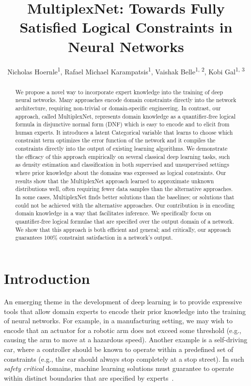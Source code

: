\documentclass[letterpaper]{article} %
\title{MultiplexNet: Towards Fully Satisfied Logical Constraints in Neural Networks}
\author {
    Nicholas Hoernle\textsuperscript{\rm 1},
    Rafael Michael Karampatsis\textsuperscript{\rm 1},
    Vaishak Belle\textsuperscript{\rm 1, \rm 2},
    Kobi Gal\textsuperscript{\rm 1, \rm 3}
}
\begin{document}
\maketitle

\begin{abstract}
We propose a novel way to incorporate expert knowledge into the training of deep neural networks.
Many approaches encode domain constraints directly into the network architecture, requiring non-trivial or domain-specific engineering. 
In contrast, our approach, called MultiplexNet, represents domain knowledge as a quantifier-free logical formula in disjunctive normal form (DNF) which is easy to encode and to elicit from human experts. 
It introduces a latent Categorical variable that learns to choose which constraint term optimizes the error function of the network and it compiles the constraints directly into the output of existing learning algorithms.
We demonstrate the efficacy of this approach empirically on several classical deep learning tasks, such as density estimation and classification in both supervised and unsupervised settings where prior knowledge about the domains was expressed as logical constraints. 
Our results show that the MultiplexNet approach learned to approximate unknown distributions well, often requiring fewer data samples than the alternative approaches.
In some cases, MultiplexNet finds better solutions than the baselines; or solutions that could not be achieved with the alternative approaches.
Our contribution is in encoding domain knowledge in a way that facilitates inference.
We specifically focus on quantifier-free logical formulae that are specified over the output domain of a network. We show that this approach is both efficient and general; and critically, our approach guarantees 100\% constraint satisfaction in a network's output. 
\end{abstract}


\section{Introduction}
\label{sec:introduction}

An emerging theme in the development of deep learning is to provide expressive tools that allow domain experts to encode their prior knowledge into the training of neural networks. 
For example, in a manufacturing setting, we may wish to encode that an actuator for a robotic arm does not exceed some threshold (e.g., causing the arm to move at a hazardous speed).
Another example is a self-driving car, where a controller should be known to operate within a predefined set of constraints (e.g., the car should always stop completely at a stop street).
In such \emph{safety critical} domains, machine learning solutions must guarantee to operate within distinct boundaries that are specified by experts~\citep{amodei2016concrete}.
\end{document}
